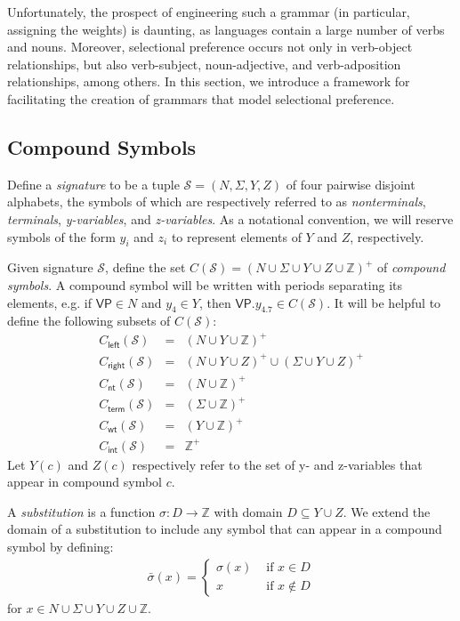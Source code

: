 \documentclass[11pt,a4paper]{article}
\begin{document}
Unfortunately, the prospect of engineering such a grammar (in particular, assigning the weights) is daunting, as languages contain a large number of verbs and nouns. Moreover, selectional preference occurs not only in verb-object relationships, but also verb-subject, noun-adjective, and verb-adposition relationships, among others. In this section, we introduce a framework for facilitating the creation of grammars that model selectional preference.

\subsection{Compound Symbols}

Define a \emph{signature} to be a tuple $\mathcal{S} = (N, \Sigma, Y, Z)$ of four pairwise disjoint alphabets, the symbols of which are respectively referred to as \emph{nonterminals}, \emph{terminals}, \emph{y-variables}, and \emph{z-variables}. As a notational convention, we will reserve symbols of the form $y_i$ and $z_i$ to represent elements of $Y$ and $Z$, respectively.

Given signature $\mathcal{S}$, define the set $C(\mathcal{S}) = (N \cup \Sigma \cup Y \cup Z \cup \mathbb{Z})^+$ of \emph{compound symbols}. A compound symbol will be written with periods separating its elements, e.g. if $\mathsf{VP} \in N$ and $y_4 \in Y$, then $\mathsf{VP}.y_4.7 \in C(\mathcal{S})$. It will be helpful to define the following subsets of $C(\mathcal{S})$:
\begin{eqnarray*}
	C_{\mathsf{left}}(\mathcal{S}) &=& (N \cup Y \cup \mathbb{Z})^+\\
	C_{\mathsf{right}}(\mathcal{S}) &=& (N \cup Y \cup Z)^+ \cup (\Sigma \cup Y \cup Z)^+\\
	C_{\mathsf{nt}}(\mathcal{S}) &=& (N \cup \mathbb{Z})^+\\
	C_{\mathsf{term}}(\mathcal{S}) &=& (\Sigma \cup \mathbb{Z})^+\\
	C_{\mathsf{wt}}(\mathcal{S}) &=& (Y \cup \mathbb{Z})^+\\
	C_{\mathsf{int}}(\mathcal{S}) &=& \mathbb{Z}^+
\end{eqnarray*}
\noindent Let $Y(c)$ and $Z(c)$ respectively refer to the set of y- and z-variables that appear in compound symbol $c$.

A \emph{substitution} is a function $\sigma: D \rightarrow \mathbb{Z}$ with domain $D \subseteq Y \cup Z$. We extend the domain of a substitution to include any symbol that can appear in a compound symbol by defining:
\begin{gather*}
\bar{\sigma}(x) = \begin{cases}
         \sigma(x) &\mbox{ if } x \in D\\
         x &\mbox{ if } x \not\in D
       \end{cases}
\end{gather*}
\noindent for $x \in N \cup \Sigma \cup Y \cup Z \cup \mathbb{Z}$.
\end{document}
